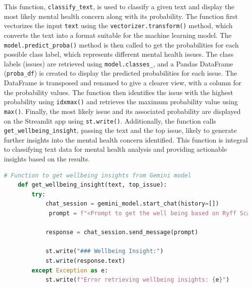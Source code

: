 \noindent
This function, \texttt{classify\_text}, is used to classify a given text and display the most likely mental health concern along with its probability. The function first vectorizes the input \texttt{text} using the \texttt{vectorizer.transform()} method, which converts the text into a format suitable for the machine learning model. The \texttt{model.predict\_proba()} method is then called to get the probabilities for each possible class label, which represents different mental health issues. The class labels (issues) are retrieved using \texttt{model.classes\_}, and a Pandas DataFrame (\texttt{proba\_df}) is created to display the predicted probabilities for each issue. The DataFrame is transposed and renamed to give a clearer view, with a column for the probability values. The function then identifies the issue with the highest probability using \texttt{idxmax()} and retrieves the maximum probability value using \texttt{max()}. Finally, the most likely issue and its associated probability are displayed on the Streamlit app using \texttt{st.write()}. Additionally, the function calls \texttt{get\_wellbeing\_insight}, passing the text and the top issue, likely to generate further insights into the mental health concern identified. This function is integral to classifying text data for mental health analysis and providing actionable insights based on the results.


\begin{tcolorbox}[colback=gray!5!white, colframe=gray!80!black, boxrule=0.5pt, title=Getting Wellbeing Insights from Gemini Model]
    \begin{lstlisting}[language=Python]
    # Function to get wellbeing insights from Gemini model
    def get_wellbeing_insight(text, top_issue):
        try:
            chat_session = gemini_model.start_chat(history=[])
             prompt = f"<Prompt to get the well being based on Ryff Scale Six Factor Model>"
    
            response = chat_session.send_message(prompt)
    
            st.write("### Wellbeing Insight:")
            st.write(response.text)
        except Exception as e:
            st.write(f"Error retrieving wellbeing insights: {e}")
    \end{lstlisting}
\end{tcolorbox}

